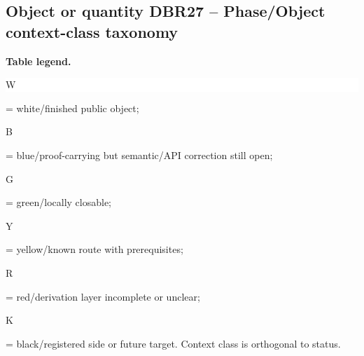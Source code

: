 \subsection*{Object or quantity DBR27 -- Phase/\allowbreak{}Object context-class taxonomy}
\hypertarget{objproof:DBR27}{}
\par\smallskip\noindent\begin{minipage}{0.99\linewidth}\footnotesize\raggedright\textbf{Table legend.} \colorbox{white}{\strut W} = white/finished public object; \colorbox{cyan!20}{\strut B} = blue/proof-carrying but semantic/API correction still open; \colorbox{green!18}{\strut G} = green/locally closable; \colorbox{yellow!25}{\strut Y} = yellow/known route with prerequisites; \colorbox{red!20}{\strut R} = red/derivation layer incomplete or unclear; \colorbox{black!18}{\strut K} = black/registered side or future target. Context class is orthogonal to status.\end{minipage}\par\vspace{0.25em}
